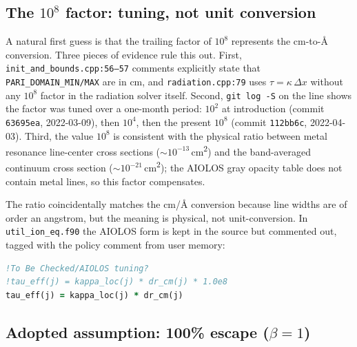 \documentclass[english,a4paper]{kiseon_memo}
\begin{document}
\subsection{The $10^{8}$ factor: tuning, not unit conversion}

A natural first guess is that the trailing factor of \(10^{8}\)
represents the cm-to-\AA{} conversion.  Three pieces of evidence rule
this out.  First, \texttt{init\_and\_bounds.cpp:56--57} comments
explicitly state that \texttt{PARI\_DOMAIN\_MIN/MAX} are in cm, and
\texttt{radiation.cpp:79} uses \(\tau = \kappa\,\Delta x\) without
any \(10^{8}\) factor in the radiation solver itself.  Second,
\texttt{git log -S} on the line shows the factor was tuned over a
one-month period: \(10^{2}\) at introduction (commit \texttt{63695ea},
2022-03-09), then \(10^{4}\), then the present \(10^{8}\) (commit
\texttt{112bb6c}, 2022-04-03).  Third, the value \(10^{8}\) is
consistent with the physical ratio between metal resonance line-center
cross sections (\(\sim 10^{-13}\)\,cm\textsuperscript{2}) and the
band-averaged continuum cross section
(\(\sim 10^{-21}\)\,cm\textsuperscript{2}); the AIOLOS gray opacity
table does not contain metal lines, so this factor compensates.

The ratio coincidentally matches the cm/\AA{} conversion because line
widths are of order an angstrom, but the meaning is physical, not
unit-conversion.  In \texttt{util\_ion\_eq.f90} the AIOLOS form is kept
in the source but commented out, tagged with the policy comment from
user memory:
\begin{lstlisting}[language=Fortran]
!To Be Checked/AIOLOS tuning?
!tau_eff(j) = kappa_loc(j) * dr_cm(j) * 1.0e8
tau_eff(j) = kappa_loc(j) * dr_cm(j)
\end{lstlisting}

\subsection{Adopted assumption: 100\% escape ($\beta = 1$)}
\label{sec:beta-one}
\end{document}
